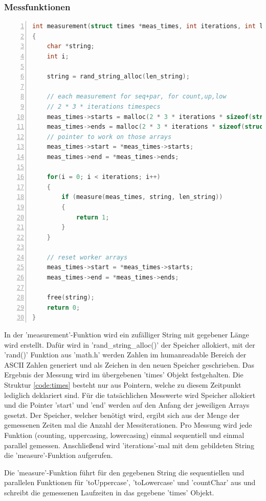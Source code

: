 \documentclass[plainarticle,zihtitle,german,final,hyperref,utf8]{zihpub}
\begin{document}
\subsubsection{Messfunktionen}
\begin{lstlisting}[language=c, numbers=left]
int measurement(struct times *meas_times, int iterations, int len_string)
{
	char *string;
	int i;

	string = rand_string_alloc(len_string);
	
	// each measurement for seq+par, for count,up,low
	// 2 * 3 * iterations timespecs
	meas_times->starts = malloc(2 * 3 * iterations * sizeof(struct timespec));
	meas_times->ends = malloc(2 * 3 * iterations * sizeof(struct timespec));
	// pointer to work on those arrays
	meas_times->start = *meas_times->starts;
	meas_times->end = *meas_times->ends;
	
	for(i = 0; i < iterations; i++)
	{
		if (measure(meas_times, string, len_string))
		{
			return 1;
		}
	}
	
	// reset worker arrays
	meas_times->start = *meas_times->starts;
	meas_times->end = *meas_times->ends;
	
	free(string);
	return 0;
}
\end{lstlisting}

In der 'measurement'-Funktion wird ein zufälliger String mit gegebener Länge wird erstellt. Dafür wird in 'rand\_string\_alloc()' der Speicher allokiert, mit der 'rand()' Funktion aus 'math.h' werden Zahlen im humanreadable Bereich der ASCII Zahlen generiert und als Zeichen in den neuen Speicher geschrieben.\newline
Das Ergebnis der Messung wird im übergebenen 'times' Objekt festgehalten. Die Struktur \ref{code:times} besteht nur aus Pointern, welche zu diesem Zeitpunkt lediglich deklariert sind. Für die tatsächlichen Messwerte wird Speicher allokiert und die Pointer 'start' und 'end' werden auf den Anfang der jeweiligen Arrays gesetzt. Der Speicher, welcher benötigt wird, ergibt sich aus der Menge der gemessenen Zeiten mal die Anzahl der Messiterationen. Pro Messung wird jede Funktion (counting, uppercasing, lowercasing) einmal sequentiell und einmal parallel gemessen.\newline
Anschließend wird 'iterations'-mal mit dem gebildeten String die 'measure'-Funktion aufgerufen.

Die 'measure'-Funktion führt für den gegebenen String die sequentiellen und parallelen Funktionen für 'toUppercase', 'toLowercase' und 'countChar' aus und schreibt die gemessenen Laufzeiten in das gegebene 'times' Objekt.
\end{document}
